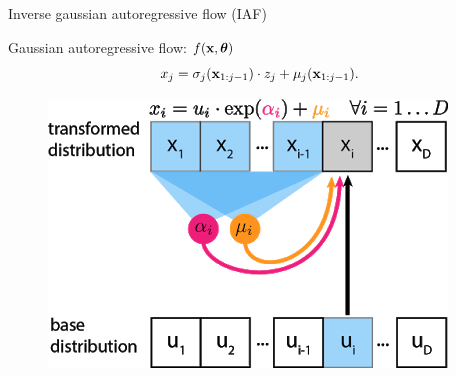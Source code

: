 \begin{frame}{Inverse gaussian autoregressive flow (IAF)}
	
	\begin{minipage}[t]{0.65\columnwidth}
		\begin{block}{Gaussian autoregressive flow: $f(\mathbf{x}, \boldsymbol{\theta})$}
			\[
			x_j = \sigma_j (\mathbf{x}_{1:j-1}) \cdot z_j + \mu_j(\mathbf{x}_{1:j-1}).
			\]
		\end{block}
	\end{minipage}%
	\begin{minipage}[t]{0.35\columnwidth}
		\begin{figure}[h]
			\centering
			\includegraphics[width=.9\linewidth]{figs/af_iaf_explained_1.png}
		\end{figure}
	\end{minipage} \\
	

\end{frame}
